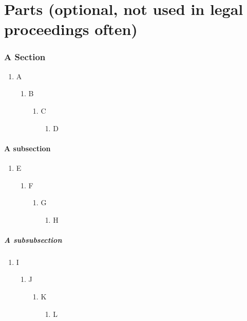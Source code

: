 \documentclass{article}
\begin{document}
\tableofcontents

\part{Parts (optional, not used in legal proceedings often)}

\section{A Section}\label{section}
\begin{enumerate}
\item A \label{section-one}
\begin{enumerate}
\item B \label{section-two}
\begin{enumerate}
\item C \label{section-three}
\begin{enumerate}
\item D \label{section-four}
\end{enumerate}
\end{enumerate}
\end{enumerate}
\end{enumerate}

\subsection{A subsection}\label{subsection}
\begin{enumerate}
\item E \label{subsection-one}
\begin{enumerate}
\item F \label{subsection-two}
\begin{enumerate}
\item G \label{subsection-three}
\begin{enumerate}
\item H \label{subsection-four}
\end{enumerate}
\end{enumerate}
\end{enumerate}
\end{enumerate}

\subsubsection{A subsubsection}
\begin{enumerate}
\item I \label{subsubsection-one}
\begin{enumerate}
\item J \label{subsubsection-two}
\begin{enumerate}
\item K \label{subsubsection-three}
\begin{enumerate}
\item L \label{subsubsection-four}
\end{enumerate}
\end{enumerate}
\end{enumerate}
\end{enumerate}
\end{document}
